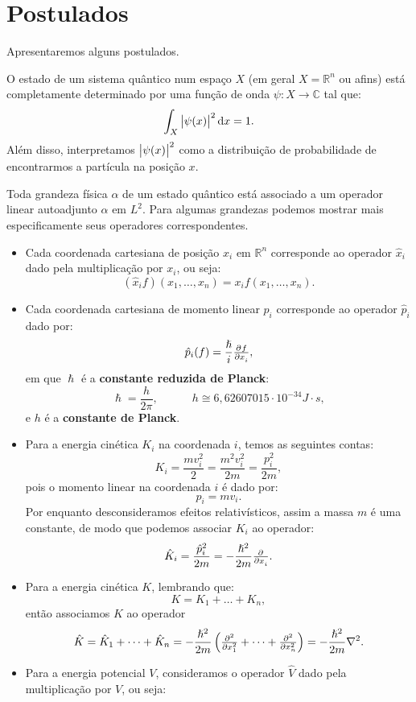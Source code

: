 \documentclass[11pt,twoside,a4paper]{book}
\begin{document}
\section{Postulados}

Apresentaremos alguns postulados.

\begin{postulado}
O estado de um sistema quântico num espaço $X$ (em geral $X=\mathbb{R}^n$ ou afins) está completamente determinado por uma função de onda $\psi:X\rightarrow\mathbb{C}$ tal que:
\[
\int_{X}\abs{\psi(x)}^2\dif x=1.
\]
Além disso, interpretamos $\abs{\psi(x)}^2$ como a distribuição de probabilidade de encontrarmos a partícula na posição $x.$
\end{postulado}

\begin{postulado}
Toda grandeza física $\alpha$ de um estado quântico está associado a um operador linear autoadjunto $\hat{\alpha}$ em $L^2.$ Para algumas grandezas podemos mostrar mais especificamente seus operadores correspondentes.
\begin{itemize}
\item Cada coordenada cartesiana de posição $x_i$ em $\mathbb{R}^n$ corresponde ao operador $\hat{x}_i$ dado pela multiplicação por $x_i$, ou seja:
\[
(\hat{x}_if)(x_1,\dots,x_n)=x_if(x_1,\dots,x_n).
\]
\item Cada coordenada cartesiana de momento linear $p_i$ corresponde ao operador $\hat{p}_i$ dado por:
\[
\hat{p}_i(f)=\frac{\hslash}{i}\pd{f}{x_i},
\]
em que $\hslash$ é a \textbf{constante reduzida de Planck}:
\[
\hslash=\frac{h}{2\pi},\quad\quad\quad h\cong 6,62607015\cdot10^{-34}J\cdot s,
\]
e $h$ é a \textbf{constante de Planck}.
\item Para a energia cinética $K_i$ na coordenada $i$, temos as seguintes contas:
\[
K_i=\frac{mv_i^2}{2}=\frac{m^2v_i^2}{2m}=\frac{p_i^2}{2m},
\]
pois o momento linear na coordenada $i$ é dado por:
\[
p_i=mv_i.
\]
Por enquanto desconsideramos efeitos relativísticos, assim a massa $m$ é uma constante, de modo que podemos associar $K_i$ ao operador:
\[
\hat{K}_i=\frac{\hat{p}_i^2}{2m}=-\frac{\hslash^2}{2m}\pd{}{x_i}.
\]
\item Para a energia cinética $K$, lembrando que:
\[
K=K_1+\dots+K_n,
\]
então associamos $K$ ao operador
\[
\hat{K}=\hat{K}_1+\dots+\hat{K}_n=-\frac{\hslash^2}{2m}\left(\pd[2]{}{x_1}+\dots+\pd[2]{}{x_n}\right)=-\frac{\hslash^2}{2m}\nabla^2.
\]
\item Para a energia potencial $V$, consideramos o operador $\hat{V}$ dado pela multiplicação por $V$, ou seja:

\end{itemize}
\end{postulado}
\end{document}
